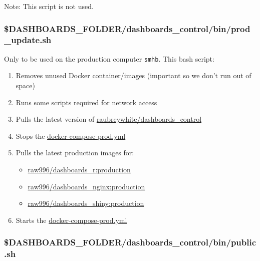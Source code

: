 \documentclass[12pt,]{article}
\providecommand{\tightlist}{%
  \setlength{\itemsep}{0pt}\setlength{\parskip}{0pt}}
\begin{document}
Note: This script is not used.

\subsubsection{\$DASHBOARDS\_FOLDER/dashboards\_control/bin/prod\_update.sh}\label{dashboards_folderdashboards_controlbinprod_update.sh}

Only to be used on the production computer \texttt{smhb}. This bash
script:

\begin{enumerate}
\def\labelenumi{\arabic{enumi}.}
\tightlist
\item
  Removes unused Docker container/images (important so we don't run out
  of space)
\item
  Runs some scripts required for network access
\item
  Pulls the latest version of
  \href{https://github.com/raubreywhite/dashboards_control}{raubreywhite/dashboards\_control}
\item
  Stops the
  \href{https://github.com/raubreywhite/dashboards_control/blob/master/infrastructure/docker-compose-prod.yml}{docker-compose-prod.yml}
\item
  Pulls the latest production images for:

  \begin{itemize}
  \tightlist
  \item
    \href{https://github.com/raubreywhite/dashboards_control/blob/master/infrastructure/dashboards_r/Dockerfile}{raw996/dashboards\_r:production}
  \item
    \href{https://github.com/raubreywhite/dashboards_control/blob/master/infrastructure/dashboards_nginx/Dockerfile}{raw996/dashboards\_nginx:production}
  \item
    \href{https://github.com/raubreywhite/dashboards_control/blob/master/infrastructure/dashboards_shiny/Dockerfile}{raw996/dashboards\_shiny:production}
  \end{itemize}
\item
  Starts the
  \href{https://github.com/raubreywhite/dashboards_control/blob/master/infrastructure/docker-compose-prod.yml}{docker-compose-prod.yml}
\end{enumerate}

\subsubsection{\$DASHBOARDS\_FOLDER/dashboards\_control/bin/public.sh}\label{dashboards_folderdashboards_controlbinpublic.sh}
\end{document}
